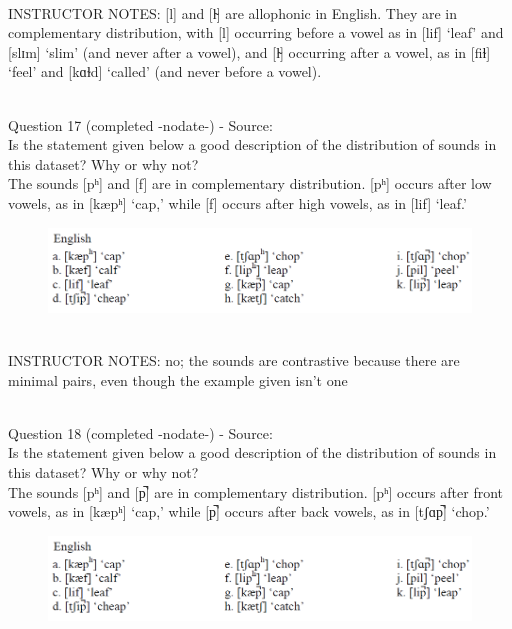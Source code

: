 \documentclass[12pt]{article}
\begin{document}
~\\
INSTRUCTOR NOTES: [l] and [l̴] are allophonic in English. They are in complementary distribution, with [l] occurring before a vowel as in [lif] ‘leaf’ and [slɪm] ‘slim’ (and never after a vowel), and [l̴] occurring after a vowel, as in [fiɫ] ‘feel’ and [kɑɫd] ‘called’ (and never before a vowel).


~\\

{\large Question 17} (completed -nodate-) - Source: \\

Is the statement given below a good description of the distribution of sounds in this dataset? Why or why not?\\

The sounds {[pʰ]} and {[f]} are in complementary distribution. {[pʰ]} occurs after low vowels, as in {[kæpʰ]} ‘cap,’ while {[f]} occurs after high vowels, as in {[lif]} ‘leaf.’

\begin{figure}[H]
\includegraphics{../images/english_labials.png}
\end{figure}

~\\
INSTRUCTOR NOTES: no; the sounds are contrastive because there are minimal pairs, even though the example given isn't one


~\\

{\large Question 18} (completed -nodate-) - Source: \\

Is the statement given below a good description of the distribution of sounds in this dataset? Why or why not?\\

The sounds {[pʰ]} and {[p̚]} are in complementary distribution. {[pʰ]} occurs after front vowels, as in {[kæpʰ]} ‘cap,’ while {[p̚]} occurs after back vowels, as in {[tʃɑp̚]} ‘chop.’

\begin{figure}[H]
\includegraphics{../images/english_labials.png}
\end{figure}
\end{document}
